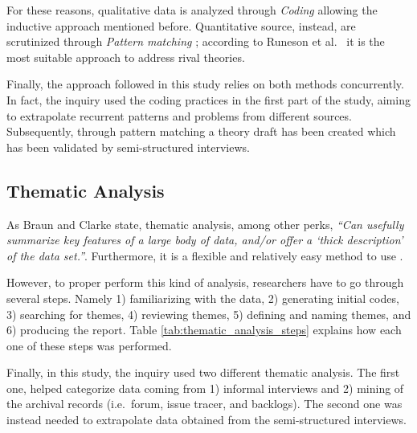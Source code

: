 For these reasons, qualitative data is analyzed through \textit{Coding} \cite{qualitative_inquiry} allowing the inductive approach mentioned before. Quantitative source, instead, are scrutinized through \textit{Pattern matching} \cite{case_study_guide}; according to Runeson et al.\ \cite{case_study_software_engineering} it is the most suitable approach to address rival theories.

Finally, the approach followed in this study relies on both methods concurrently. In fact, the inquiry used the coding practices in the first part of the study, aiming to extrapolate recurrent patterns and problems from different sources. Subsequently, through pattern matching a theory draft has been created which has been validated by semi-structured interviews.

\subsection{Thematic Analysis}
As Braun and Clarke \cite{thematic_analysis} state, thematic analysis, among other perks, \textit{``Can usefully summarize key features of a large body of data, and/or offer a ‘thick description’ of the data set.''}. Furthermore, it is a flexible and relatively easy method to use \cite{thematic_analysis}.

However, to proper perform this kind of analysis, researchers have to go through several steps. Namely 1) familiarizing with the data, 2) generating initial codes, 3) searching for themes, 4) reviewing themes, 5) defining and naming themes, and 6) producing the report. Table \ref{tab:thematic_analysis_steps} explains how each one of these steps was performed.

Finally, in this study, the inquiry used two different thematic analysis. The first one, helped categorize data coming from 1) informal interviews and 2) mining of the archival records (i.e.\ forum, issue tracer, and backlogs). The second one was instead needed to extrapolate data obtained from the semi-structured interviews.



